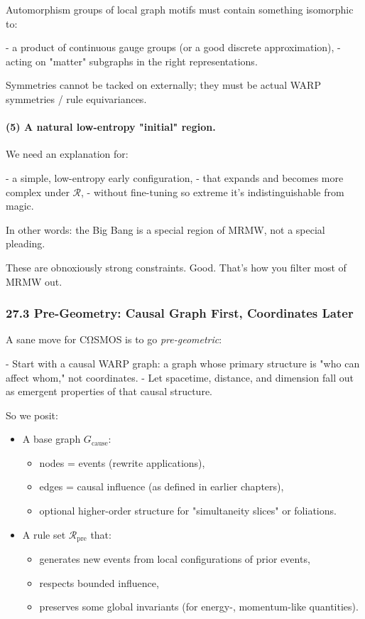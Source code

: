 Automorphism groups of local graph motifs must contain something isomorphic to:

- a product of continuous gauge groups (or a good discrete approximation),
- acting on "matter" subgraphs in the right representations.

Symmetries cannot be tacked on externally; they must be actual WARP symmetries / rule equivariances.

\paragraph{(5) A natural low-entropy "initial" region.}

We need an explanation for:

- a simple, low-entropy early configuration,
- that expands and becomes more complex under $\mathcal{R}$,
- without fine-tuning so extreme it’s indistinguishable from magic.

In other words: the Big Bang is a special region of MRMW, not a special pleading.

These are obnoxiously strong constraints. Good. That’s how you filter most of MRMW out.

\subsubsection*{27.3  Pre-Geometry: Causal Graph First, Coordinates Later}

A sane move for CΩSMOS is to go \emph{pre-geometric}:

- Start with a causal WARP graph: a graph whose primary structure is "who can affect whom," not coordinates.
- Let spacetime, distance, and dimension fall out as emergent properties of that causal structure.

So we posit:

\begin{itemize}
  \item A base graph $G_\text{cause}$:
    \begin{itemize}
      \item nodes = events (rewrite applications),
      \item edges = causal influence (as defined in earlier chapters),
      \item optional higher-order structure for "simultaneity slices" or foliations.
    \end{itemize}

  \item A rule set $\mathcal{R}_\text{pre}$ that:
    \begin{itemize}
      \item generates new events from local configurations of prior events,
      \item respects bounded influence,
      \item preserves some global invariants (for energy-, momentum-like quantities).
    \end{itemize}
\end{itemize}

